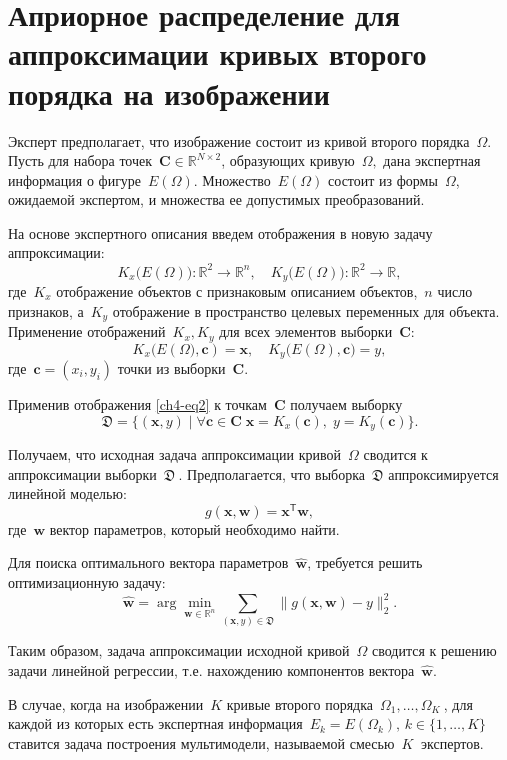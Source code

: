\section{Априорное распределение для аппроксимации кривых второго порядка на изображении}

Эксперт предполагает, что изображение состоит из кривой второго порядка~$\Omega$.
Пусть для набора точек~$\mathbf{C}\in\mathbb{R}^{N \times 2}$, образующих кривую~$\Omega,$ дана экспертная информация о фигуре~$E(\Omega).$
Множество~$E(\Omega)$ состоит из формы~$\Omega$, ожидаемой экспертом, и множества ее допустимых преобразований.

На основе экспертного описания введем отображения в новую задачу аппроксимации:
\[
\label{ch4-eq1}
	K_{x}\bigl(E(\Omega)\bigr): \mathbb{R}^{2} \rightarrow \mathbb{R}^{n}, \quad K_{y}\bigl(E(\Omega)\bigr): \mathbb{R}^{2} \rightarrow \mathbb{R},
\] 
где~$K_{x}$ отображение объектов с признаковым описанием объектов,~$n$ число признаков, а~$K_{y}$ отображение в пространство целевых переменных для объекта. Применение отображений~$K_{x}, K_{y}$ для всех элементов выборки~$\mathbf{C}$:
\[
\label{ch4-eq2}
	K_{x}\bigl(E(\Omega\bigr), \mathbf{c}) = \mathbf{x}, \quad  K_{y}\bigl(E(\Omega), \mathbf{c}\bigr) = y,
\]
где~$\mathbf{c} = (x_i, y_i)$ точки из выборки~$\mathbf{C}$.

Применив отображения \eqref{ch4-eq2} к точкам~$\mathbf{C}$ получаем выборку
\[
\label{ch4-eq4}
    \mathfrak{D} = \{(\mathbf{x}, y) \; | \; \forall \mathbf{c} \in \mathbf{C} \; \mathbf{x} = K_x(\mathbf{c}), \; y = K_y(\mathbf{c}) \}.
\]

Получаем, что исходная задача аппроксимации кривой~$\Omega$ сводится к аппроксимации выборки~$\mathfrak{D}~$. Предполагается, что выборка~$\mathfrak{D}$ аппроксимируется линейной моделью:
\[
	g(\mathbf{x}, \mathbf{w}) = \mathbf{x}^\mathsf{T} \mathbf{w},
\] 
где~$\mathbf{w}$ вектор параметров, который необходимо найти.

Для поиска оптимального вектора параметров~$\hat{\mathbf{w}}$, требуется решить оптимизационную задачу:
\[
	\hat{\mathbf{w}} = \arg\min_{\mathbf{w}\in\mathbb{R}^n} \sum_{\left(\mathbf{x}, y\right) \in \mathfrak{D}}\|g(\mathbf{x}, \mathbf{w}) - y \|_2^2.
\] 

Таким образом, задача аппроксимации исходной кривой~$\Omega$ сводится к решению задачи линейной регрессии, т.е. нахождению компонентов вектора~$\hat{\mathbf{w}}$.

В случае, когда на изображении~$K$ кривые второго порядка~$\Omega_1, \dots, \Omega_K~$, для каждой из которых есть экспертная информация~$E_k = E(\Omega_k), \, k \in \{ 1, \dots, K \}~$ ставится задача построения мультимодели, называемой смесью~$ K~$ экспертов.


